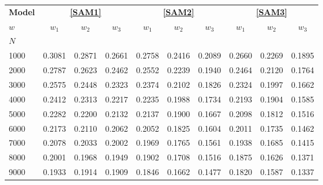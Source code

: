 \begin{tabular*}{\textwidth}{@{\extracolsep\fill}lccccccccc@{}}
\toprule
\textbf{Model} & \multicolumn{3}{c}{\textbf{\eqref{SAM1}}} & \multicolumn{3}{c}{\textbf{\eqref{SAM2}}} & \multicolumn{3}{c}{\textbf{\eqref{SAM3}}} \\
\cmidrule{2-4} \cmidrule{5-7} \cmidrule{8-10}
\textbf{$w$} & \textbf{$w_1$} & \textbf{$w_2$} & \textbf{$w_3$} & \textbf{$w_1$} & \textbf{$w_2$} & \textbf{$w_3$} & \textbf{$w_1$} & \textbf{$w_2$} & \textbf{$w_3$} \\
\midrule
$N$ & & & & & & & & & \\
1000 & 0.3081 & 0.2871 & 0.2661 & 0.2758 & 0.2416 & 0.2089 & 0.2660 & 0.2269 & 0.1895 \\
2000 & 0.2787 & 0.2623 & 0.2462 & 0.2552 & 0.2239 & 0.1940 & 0.2464 & 0.2120 & 0.1764 \\
3000 & 0.2575 & 0.2448 & 0.2323 & 0.2374 & 0.2102 & 0.1826 & 0.2324 & 0.1997 & 0.1662 \\
4000 & 0.2412 & 0.2313 & 0.2217 & 0.2235 & 0.1988 & 0.1734 & 0.2193 & 0.1904 & 0.1585 \\
5000 & 0.2282 & 0.2200 & 0.2132 & 0.2137 & 0.1900 & 0.1667 & 0.2098 & 0.1812 & 0.1516 \\
6000 & 0.2173 & 0.2110 & 0.2062 & 0.2052 & 0.1825 & 0.1604 & 0.2011 & 0.1735 & 0.1462 \\
7000 & 0.2078 & 0.2033 & 0.2002 & 0.1969 & 0.1765 & 0.1561 & 0.1938 & 0.1685 & 0.1415 \\
8000 & 0.2001 & 0.1968 & 0.1949 & 0.1902 & 0.1708 & 0.1516 & 0.1875 & 0.1626 & 0.1371 \\
9000 & 0.1933 & 0.1914 & 0.1909 & 0.1846 & 0.1662 & 0.1477 & 0.1820 & 0.1587 & 0.1337 \\
\bottomrule
\end{tabular*}
